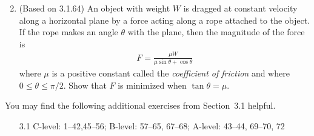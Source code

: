 \documentclass{article}
\begin{document}
\begin{enumerate}
\begin{multicols}{2}
\begin{enumerate}
  \end{enumerate}
  \end{multicols}
\item (Based on 3.1.64)
  An object with weight $W$ is dragged at constant velocity 
  along a horizontal plane by a force
  acting along a rope attached to the object.  If the rope makes an angle
  $\theta$ with the plane, then the magnitude of the force is
  \begin{align*}
    F = \frac{\mu W}{\mu\sin\theta + \cos\theta}
  \end{align*}
  where $\mu$ is a positive constant called the 
  \textit{coefficient of friction} and where $0\le\theta\le\pi/2$.
  Show that $F$ is minimized when $\tan\theta=\mu$.
\end{enumerate}


\noindent
You may find the following additional exercises from Section~3.1
helpful.
\begin{itemize}
\item[3.1] 
  C-level: 1--42,45--56; 
  B-level: 57--65, 67--68; 
  A-level: 43--44, 69--70, 72
\end{itemize}
\end{document}
